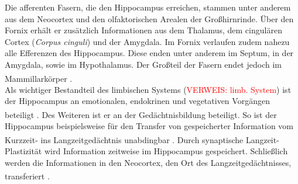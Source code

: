 \documentclass[12pt,a4paper,pdftex]{article}
\begin{document}
\noindent Die afferenten Fasern, die den Hippocampus erreichen, stammen unter anderem aus dem Neocortex und den olfaktorischen Arealen der Großhirnrinde. Über den Fornix erhält er zusätzlich Informationen aus dem Thalamus, dem cingulären Cortex (\textit{Corpus cinguli}) und der Amygdala. Im Fornix verlaufen zudem nahezu alle Efferenzen des Hippocampus. Diese enden unter anderem im Septum, in der Amygdala, sowie im Hypothalamus. Der Großteil der Fasern endet jedoch im Mammillarkörper \textsuperscript{\cite[9]{trepel2011neuroanatomie}}.\\

\noindent Als wichtiger Bestandteil des limbischen Systems (\textcolor{red}{VERWEIS: limb. System}) ist der Hippocampus an emotionalen, endokrinen und vegetativen Vorgängen beteiligt \textsuperscript{\cite[9]{trepel2011neuroanatomie}}. Des Weiteren ist er an der Gedächtnisbildung beteiligt. So ist der Hippocampus beispielsweise für den Transfer von gespeicherter Information vom Kurzzeit- ins Langzeitgedächtnis unabdingbar \textsuperscript{\cite[6]{storch2012lehrbuchzoo}}. Durch synaptische Langzeit-Plastizität wird Information zeitweise im Hippocampus gespeichert. Schließlich werden die Informationen in den Neocortex, den Ort des Langzeitgedächtnisses, transferiert \textsuperscript{\cite[18]{kandel2013principles}}.
\end{document}
